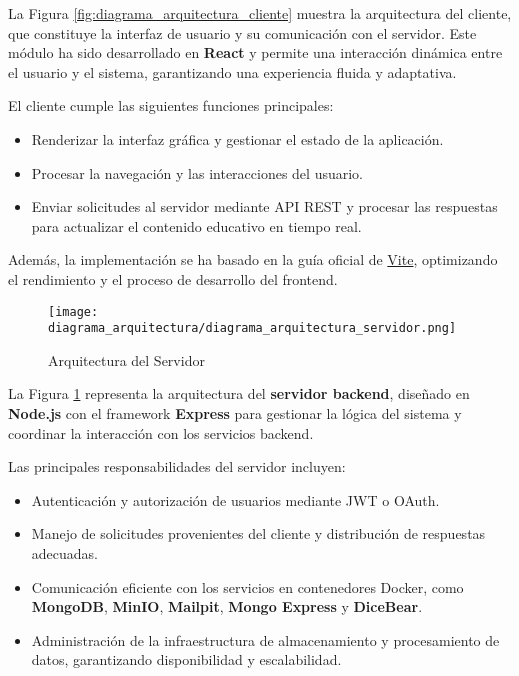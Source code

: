 La Figura \ref{fig:diagrama_arquitectura_cliente} muestra la arquitectura del
cliente, que constituye la interfaz de usuario y su comunicación con el
servidor. Este módulo ha sido desarrollado en \textbf{React} y permite una
interacción dinámica entre el usuario y el sistema, garantizando una experiencia
fluida y adaptativa.

El cliente cumple las siguientes funciones principales:
\begin{itemize}
    \item Renderizar la interfaz gráfica y gestionar el estado de la aplicación.
    \item Procesar la navegación y las interacciones del usuario.
    \item Enviar solicitudes al servidor mediante API REST y procesar las
    respuestas para actualizar el contenido educativo en tiempo real.
\end{itemize}

Además, la implementación se ha basado en la guía oficial de
\href{https://vite.dev/guide/}{Vite}, optimizando el rendimiento y el proceso de
desarrollo del frontend.

\begin{figure}[H]
    \centering
    \texttt{[image: diagrama\_arquitectura/diagrama\_arquitectura\_servidor.png]}
    \caption{Arquitectura del Servidor}
    \label{fig:diagrama_arquitectura_servidor}
\end{figure}

La Figura \ref{fig:diagrama_arquitectura_servidor} representa la arquitectura
del \textbf{servidor backend}, diseñado en \textbf{Node.js} con el framework
\textbf{Express} para gestionar la lógica del sistema y coordinar la interacción
con los servicios backend.

Las principales responsabilidades del servidor incluyen:
\begin{itemize}
    \item Autenticación y autorización de usuarios mediante JWT o OAuth.
    \item Manejo de solicitudes provenientes del cliente y distribución de
    respuestas adecuadas.
    \item Comunicación eficiente con los servicios en contenedores Docker, como
    \textbf{MongoDB}, \textbf{MinIO}, \textbf{Mailpit}, \textbf{Mongo Express} y
    \textbf{DiceBear}.
    \item Administración de la infraestructura de almacenamiento y procesamiento
    de datos, garantizando disponibilidad y escalabilidad.
\end{itemize}

